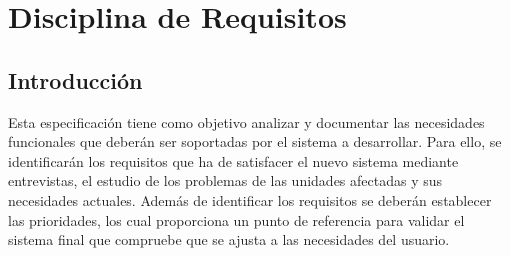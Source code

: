 
\chapter{Disciplina de Requisitos}
\label{chap:requisito}

\section{Introducción}

Esta especificación tiene como objetivo analizar y documentar las necesidades funcionales que deberán ser soportadas por el sistema a desarrollar. Para ello, se identificarán los requisitos que ha de satisfacer el nuevo sistema mediante entrevistas, el estudio de los problemas de las unidades afectadas y sus necesidades actuales. Además de identificar los requisitos se deberán establecer las prioridades, los cual proporciona un punto de referencia para validar el sistema final que compruebe que se ajusta a las necesidades del usuario.

